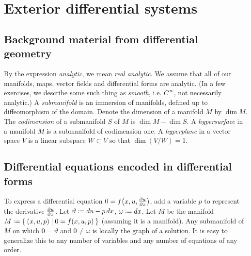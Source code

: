 \chapter{Exterior differential systems}\label{chapter:eds}

\section{Background material from differential geometry}
By the expression \emph{analytic}, we mean \emph{real analytic}.
We assume that all of our manifolds, maps, vector fields and differential forms are analytic.
(In a few exercises, we describe some such thing as \emph{smooth}, i.e. \(C^{\infty}\), not necessarily analytic.)
A \emph{submanifold} is an immersion of manifolds, defined up to diffeomorphism of the domain.
Denote the dimension of a manifold \(M\) by \(\dim M\).
The \emph{codimension} of a submanifold \(S\) of \(M\) is \(\dim M - \dim S\).
A \emph{hypersurface} in a manifold \(M\) is a submanifold of codimension one.
A \emph{hyperplane} in a vector space \(V\) is a linear subspace \(W\subset V\) so that \(\dim (V/W)=1\).


\section{Differential equations encoded in differential forms}
To express a differential equation \(0=f\of{x,u,\pderiv{u}{x}}\), add a variable \(p\) to represent the derivative \(\pderiv{u}{x}\).
Let \(\vartheta\defeq du-p \, dx\), \(\omega\defeq dx\). Let \(M\) be the manifold \(M\defeq\Set{(x,u,p)|0=f\of{x,u,p}}\) (assuming it is a manifold).
Any submanifold of \(M\) on which \(0=\vartheta\) and \(0\ne \omega\) is locally the graph of a solution.
It is easy to generalize this to any number of variables and any number of equations of any order.

